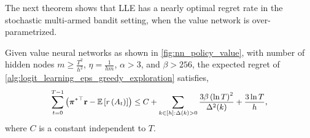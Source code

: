 The next theorem shows that LLE has a nearly optimal regret rate in the stochastic multi-armed bandit setting, when the value network is over-parametrized.
\begin{thm}
\label{thm:logit_learning_main_result}
    Given value neural networks as shown in \cref{fig:nn_policy_value}, with number of hidden nodes $m \ge \frac{T^2}{h^2}$, $\eta = \frac{1}{h m}$,  $\alpha > 3$, and $\beta > 256$, the expected regret of \cref{alg:logit_learning_eps_greedy_exploration} satisfies,
\begin{equation*}
\small
\begin{split}
    \sum\limits_{t=0}^{T-1}{ \left( {\rvpi^*}^\top \rvr - \sE \left[ r\left(A_t\right) \right] \right)}  \le C + \sum\limits_{k \in [h] : \Delta(k) > 0}{ \frac{ 3 \beta \left( \ln{T} \right)^2}{\Delta^2(k)} }  + \frac{ 3 \ln{T}}{h},
\end{split}
\end{equation*}
where $C$ is a constant independent to $T$.
\end{thm}

